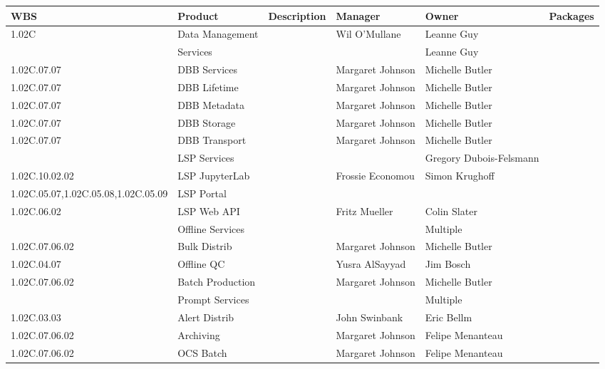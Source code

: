 

\tiny
\begin{longtable}{|p{}|p{}|p{}|p{}|p{}|p{}|}\hline
\textbf{WBS} & Product & Description & Manager & Owner & Packages\\ \hline
1.02C &  Data Management &  & Wil O'Mullane & Leanne Guy & \\ \hline
 &  Services &  &  & Leanne Guy & \\ \hline
1.02C.07.07 &  DBB Services &  & Margaret Johnson & Michelle Butler & \\ \hline
1.02C.07.07 &  DBB Lifetime &  & Margaret Johnson & Michelle Butler & \\ \hline
1.02C.07.07 &  DBB Metadata &  & Margaret Johnson & Michelle Butler & \\ \hline
1.02C.07.07 &  DBB Storage &  & Margaret Johnson & Michelle Butler & \\ \hline
1.02C.07.07 &  DBB Transport &  & Margaret Johnson & Michelle Butler & \\ \hline
 &  LSP Services &  &  & Gregory Dubois-Felsmann & \\ \hline
1.02C.10.02.02 &  LSP JupyterLab &  & Frossie Economou & Simon Krughoff & \\ \hline
1.02C.05.07,1.02C.05.08,1.02C.05.09 &  LSP Portal &  &  &  & \\ \hline
1.02C.06.02 &  LSP Web API &  & Fritz Mueller & Colin Slater & \\ \hline
 &  Offline Services &  &  & Multiple & \\ \hline
1.02C.07.06.02 &  Bulk Distrib &  & Margaret Johnson & Michelle Butler & \\ \hline
1.02C.04.07 &  Offline QC &  & Yusra AlSayyad & Jim Bosch & \\ \hline
1.02C.07.06.02 &  Batch Production &  & Margaret Johnson & Michelle Butler & \\ \hline
 &  Prompt Services &  &  & Multiple & \\ \hline
1.02C.03.03 &  Alert Distrib &  & John Swinbank & Eric Bellm & \\ \hline
1.02C.07.06.02 &  Archiving &  & Margaret Johnson & Felipe Menanteau & \\ \hline
1.02C.07.06.02 &  OCS Batch &  & Margaret Johnson & Felipe Menanteau & \\ \hline

\end{longtable}

